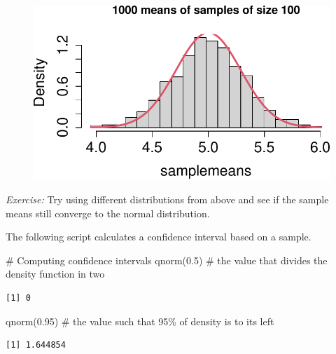 \documentclass[
  letterpaper,
  DIV=11,
  numbers=noendperiod]{scrreprt}
\newenvironment{Shaded}{\begin{snugshade}}{\end{snugshade}}
\newcommand{\CommentTok}[1]{\textcolor[rgb]{0.37,0.37,0.37}{#1}}
\newcommand{\FloatTok}[1]{\textcolor[rgb]{0.68,0.00,0.00}{#1}}
\newcommand{\FunctionTok}[1]{\textcolor[rgb]{0.28,0.35,0.67}{#1}}
\newcommand{\NormalTok}[1]{\textcolor[rgb]{0.00,0.23,0.31}{#1}}
\begin{document}
\begin{figure}[H]

{\centering \includegraphics{./04-distributions_files/figure-pdf/unnamed-chunk-15-1.pdf}

}

\end{figure}

\emph{Exercise:} Try using different distributions from above and see if
the sample means still converge to the normal distribution.

The following script calculates a confidence interval based on a sample.

\begin{Shaded}
\begin{Highlighting}[]
\CommentTok{\# Computing confidence intervals}
\FunctionTok{qnorm}\NormalTok{(}\FloatTok{0.5}\NormalTok{) }\CommentTok{\# the value that divides the density function in two}
\end{Highlighting}
\end{Shaded}

\begin{verbatim}
[1] 0
\end{verbatim}

\begin{Shaded}
\begin{Highlighting}[]
\FunctionTok{qnorm}\NormalTok{(}\FloatTok{0.95}\NormalTok{) }\CommentTok{\# the value such that 95\% of density is to its left }
\end{Highlighting}
\end{Shaded}

\begin{verbatim}
[1] 1.644854
\end{verbatim}
\end{document}
